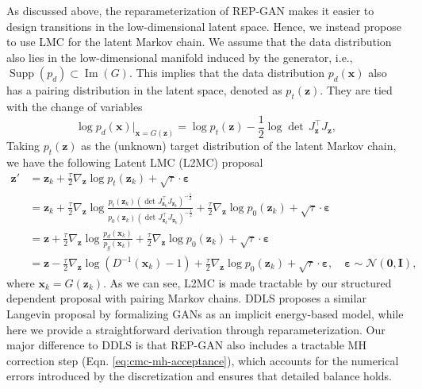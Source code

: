 \documentclass[runningheads]{llncs}
\newcommand{\bx}{\mathbf{x}}
\newcommand{\bz}{\mathbf{z}}
\newcommand{\bI}{\mathbf{I}}
\newcommand{\bvarepsilon}{\bm{\varepsilon}}
\newcommand{\cN}{\mathcal{N}}
\newcommand{\bzero}{\mathbf{0}}
\newcommand{\<}{\left\langle}
\renewcommand{\>}{\right\rangle}
\begin{document}
As discussed above, the reparameterization of REP-GAN makes it easier to design transitions in the low-dimensional latent space. Hence, we instead propose to use LMC for the latent Markov chain.
We assume that the data distribution also lies in the low-dimensional manifold induced by the generator, i.e., 
$\operatorname{Supp}\left(p_d\right)\subset\operatorname{Im}(G)$. This implies that the data distribution $p_d(\bx)$ also has a pairing distribution in the latent space, denoted as $p_t(\bz)$. They are tied with the change of variables
\begin{equation}
\log p_d(\bx)\rvert_{\bx=G(\bz)}=\log p_t(\bz) - \frac{1}{2} \log\det\, J_{\bz}^\top J_{\bz},
\end{equation}
Taking $p_t(\bz)$ as the (unknown) target distribution of the latent Markov chain, we have the following Latent LMC (L2MC) proposal 
\begin{equation}
\begin{aligned}
\bz'&=\bz_k+\frac{\tau}{2}\nabla_{\bz}\log p_t(\bz_k)+\sqrt{\tau}\cdot\bvarepsilon\\
&=\bz_k+\frac{\tau}{2}\nabla_{\bz}\log\frac{p_t(\bz_k)
\left(\det J_{\bz_k}^\top J_{\bz_k}\right)^{-\frac{1}{2}}
}{p_0(\bz_k)
\left(\det J_{\bz_k}^\top J_{\bz_k}\right)^{-\frac{1}{2}}
}+\frac{\tau}{2}\nabla_{\bz}\log p_0(\bz_k)+\sqrt{\tau}\cdot\bvarepsilon\\
&=\bz+\frac{\tau}{2}\nabla_{\bz}\log\frac{p_d(\bx_k)}{p_g(\bx_k)}+\frac{\tau}{2}\nabla_{\bz}\log p_0(\bz_k)+\sqrt{\tau}\cdot\bvarepsilon\\
&=\bz-\frac{\tau}{2}\nabla_{\bz}\log(D^{-1}(\bx_k)-1)+\frac{\tau}{2}\nabla_{\bz}\log p_0(\bz_k)+\sqrt{\tau}\cdot\bvarepsilon, \quad\bvarepsilon\sim\cN(\bzero,\bI),
\end{aligned}
\label{eq:langevin}
\end{equation}
where $\bx_k=G(\bz_k)$. As we can see, L2MC is made tractable by our structured dependent proposal with pairing Markov chains. DDLS \cite{che2020your} proposes a similar Langevin proposal by formalizing GANs as an implicit energy-based model, while here we provide a straightforward derivation through reparameterization. Our major difference to DDLS is that REP-GAN also includes a tractable MH correction step (Eqn. \eqref{eq:cmc-mh-acceptance}), which accounts for the numerical errors introduced by the  discretization and ensures that detailed balance holds. 
\end{document}
